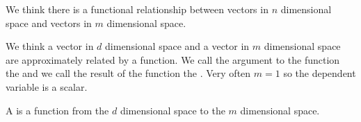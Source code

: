 
\sbasic














\sstart
{}


We think there
is a functional
relationship
between vectors in $n$
dimensional space and vectors
in $m$ dimensional space.


We think a vector in
$d$ dimensional space
and a vector in $m$ dimensional
space are approximately related
by a function.
We call the argument to the
function the 
and we call the result
of the function the .
Very often $m = 1$ so the dependent
variable is a scalar.

A  is a function
from the $d$ dimensional space
to the $m$ dimensional space.
\strats
